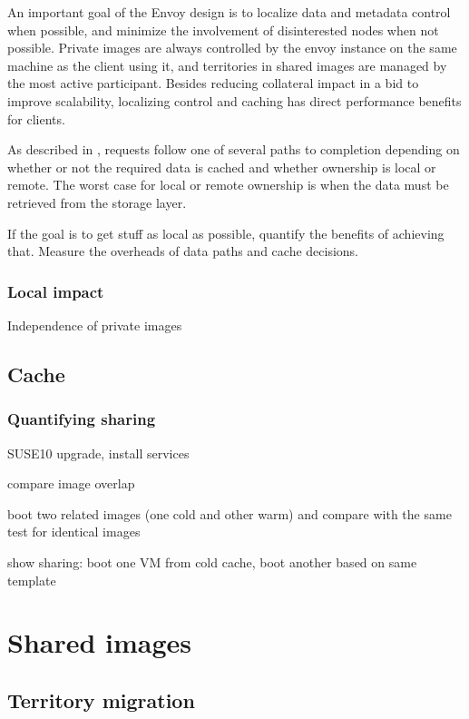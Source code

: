 An important goal of the Envoy design is to localize data and metadata control when possible, and minimize the involvement of disinterested nodes when not possible. Private images are always controlled by the envoy instance on the same machine as the client using it, and territories in shared images are managed by the most active participant. Besides reducing collateral impact in a bid to improve scalability, localizing control and caching has direct performance benefits for clients.

As described in , requests follow one of several paths to completion depending on whether or not the required data is cached and whether ownership is local or remote. The worst case for local or remote ownership is when the data must be retrieved from the storage layer.


If the goal is to get stuff as local as possible, quantify the benefits of achieving that. Measure the overheads of data paths and cache decisions.

\subsubsection{Local impact}

Independence of private images

\subsection{Cache}

\subsubsection{Quantifying sharing}\label{sec:quantifying-sharing}

SUSE10 upgrade, install services

compare image overlap

boot two related images (one cold and other warm) and compare with the same test for identical images

show sharing: boot one VM from cold cache, boot another based on same template

\section{Shared images}\label{sec:shared-images}



\subsection{Territory migration}

